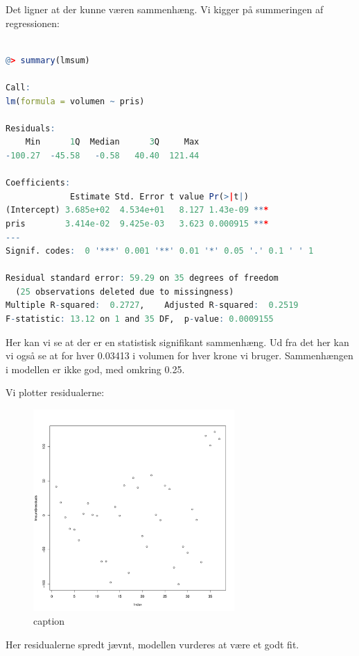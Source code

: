 \documentclass{article}
\begin{document}
Det ligner at der kunne væren sammenhæng. Vi kigger på summeringen af
regressionen: 
\begin{lstlisting}[basicstyle=\ttfamily, language=R, keywordstyle=\color{blue}\bfseries, rulecolor=\color{black}]

@> summary(lmsum)

Call:
lm(formula = volumen ~ pris)

Residuals:
    Min      1Q  Median      3Q     Max
-100.27  -45.58   -0.58   40.40  121.44

Coefficients:
             Estimate Std. Error t value Pr(>|t|)
(Intercept) 3.685e+02  4.534e+01   8.127 1.43e-09 ***
pris        3.414e-02  9.425e-03   3.623 0.000915 ***
---
Signif. codes:  0 '***' 0.001 '**' 0.01 '*' 0.05 '.' 0.1 ' ' 1

Residual standard error: 59.29 on 35 degrees of freedom
  (25 observations deleted due to missingness)
Multiple R-squared:  0.2727,    Adjusted R-squared:  0.2519
F-statistic: 13.12 on 1 and 35 DF,  p-value: 0.0009155
\end{lstlisting}
Her kan vi se at der er en statistisk signifikant sammenhæng.
Ud fra det her kan vi også se at for hver 0.03413 i volumen for hver krone vi
bruger. Sammenhængen i modellen er ikke god, med omkring 0.25.

Vi plotter residualerne:
\begin{figure}[H]
  \centering
  \includegraphics[width=0.685\textwidth]{../fridge_residuals.pdf}
  \caption{caption}
\end{figure}

Her residualerne spredt jævnt, modellen vurderes at være et godt fit.
\end{document}

